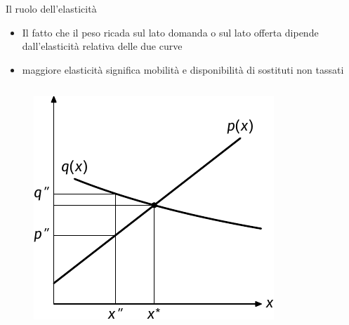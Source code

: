 \documentclass[11pt]{beamer}
\begin{document}
\begin{frame}{Il ruolo dell'elasticità}
\begin{itemize}
\item Il fatto che il peso ricada sul lato domanda o sul lato offerta dipende
dall'elasticità relativa delle due curve
\item maggiore elasticità significa mobilità e disponibilità di sostituti non
tassati
\end{itemize}

\begin{columns}
\begin{column}{.45\columnwidth}
\begin{figure}[htbp]
\centering
\includegraphics[width=\textwidth]{./figure/incidenza-5.pdf}
\end{figure}
\end{column}


\end{columns}
\end{frame}
\end{document}
